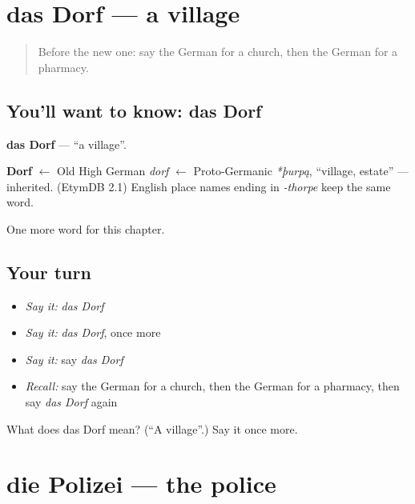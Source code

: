 \section[das Dorf]{das Dorf — a village}

\label{lesson:GE-C97-dorf}



\begin{quote}
Before the new one: say the German for a church, then the German for a pharmacy.
\end{quote}

\subsection*{You'll want to know: das Dorf}
\textbf{das Dorf} — \textquotedblleft{}a village\textquotedblright{}.

\begin{cousinweb}
\textbf{Dorf} $\leftarrow$ Old High German \emph{dorf} $\leftarrow$ Proto-Germanic \emph{*þurpą}, \textquotedblleft{}village, estate\textquotedblright{} — inherited. (EtymDB 2.1) English place names ending in \emph{-thorpe} keep the same word.
\end{cousinweb}

\begin{grammarlens}[title={What you've built}]
One more word for this chapter.
\end{grammarlens}

\subsection*{Your turn}
\begin{itemize}
\raggedright
  \item \emph{Say it:} \emph{das Dorf}
  \item \emph{Say it:} \emph{das Dorf}, once more
  \item \emph{Say it:} say \emph{das Dorf}
  \item \emph{Recall:} say the German for a church, then the German for a pharmacy, then say \emph{das Dorf} again
\end{itemize}

\begin{tcolorbox}[breakable,colback=teal!4,colframe=teal!35!black,title={Before you move on}]
What does das Dorf mean? (\textquotedblleft{}A village\textquotedblright{}.) Say it once more.
\end{tcolorbox}
\section[die Polizei]{die Polizei — the police}

